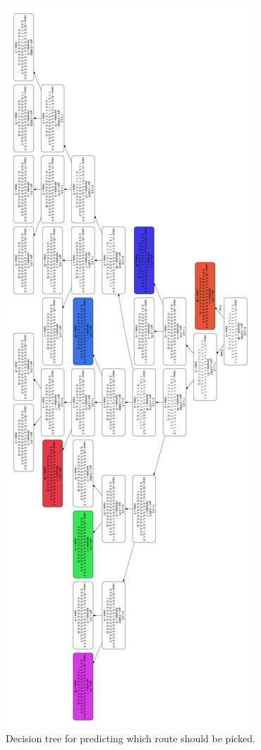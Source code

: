 \documentclass{sigchi}
\begin{document}
\begin{figure}[!h]
\centering
\includegraphics[width=2.0\columnwidth]{pics/routeDT.png}
\caption{Decision tree for predicting which route should be picked.}
\label{fig:dt9}
\end{figure}
\end{document}
